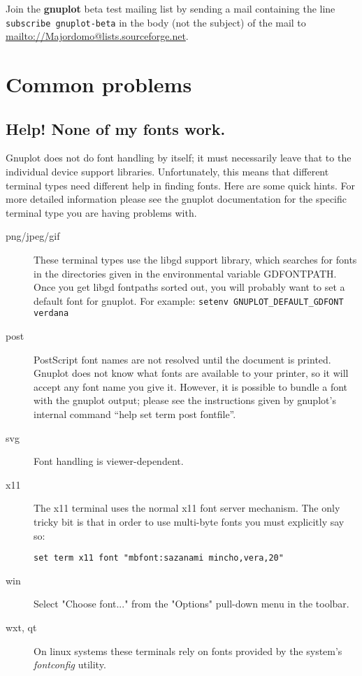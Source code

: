 \documentclass[a4paper,11pt]{article}
\def\mailto#1{{\small\href{mailto://#1}{\url{mailto://#1}}}}
\newcommand{\mailto}[1]%
            {\htmladdnormallink{\latex{\url{<#1>}}\html{\textit{#1}}}%
                {mailto:#1}%
            }
\newcommand{\gnuplot}{\textbf{gnuplot }}
\begin{document}
Join the \gnuplot beta test mailing list by sending a mail
containing the line
\verb+subscribe gnuplot-beta+
in the body (not the subject) of the mail to
\mailto{Majordomo@lists.sourceforge.net}.


\section{Common problems}


\subsection{Help! None of my fonts work.}

Gnuplot does not do font handling by itself; it must necessarily leave
that to the individual device support libraries. Unfortunately, this
means that different terminal types need different help in finding
fonts. Here are some quick hints. For more detailed information please
see the gnuplot documentation for the specific terminal type you are
having problems with.

\begin{description}
\item [{png/jpeg/gif}] These terminal types use the libgd support library, which
searches for fonts in the directories given in the environmental variable
GDFONTPATH. Once you get libgd fontpaths sorted out, you will probably
want to set a default font for gnuplot.
For example: \verb+setenv GNUPLOT_DEFAULT_GDFONT verdana+
\item [{post}] PostScript font names are not resolved until the document
is printed. Gnuplot does not know what fonts are available to your
printer, so it will accept any font name you give it. However, it
is possible to bundle a font with the gnuplot output; please see the
instructions given by gnuplot's internal command {}``help set term
post fontfile''.
\item [{svg}] Font handling is viewer-dependent.
\item [{x11}] The x11 terminal uses the normal x11 font server mechanism.
The only tricky bit is that in order to use multi-byte fonts you must
explicitly say so:
\small\begin{verbatim}
set term x11 font "mbfont:sazanami mincho,vera,20"
\end{verbatim}\normalsize
\item [{win}] Select "Choose font..." from the "Options" pull-down menu
in the toolbar.
\item [{wxt, qt}] On linux systems these terminals rely on fonts provided
by the system's \textit{fontconfig} utility.
\end{description}
\end{document}

